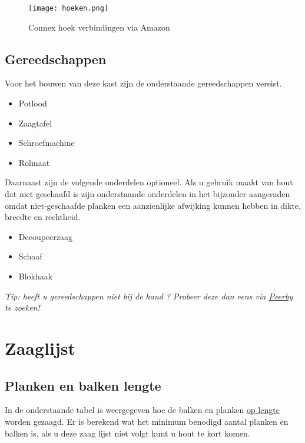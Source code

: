 \documentclass{article}
\begin{document}


\begin{figure}[h!]
    \centering
    \texttt{[image: hoeken.png]}
    \caption{Connex hoek verbindingen via Amazon}
    \label{fig:hoeken}
\end{figure}

\subsection{Gereedschappen}

Voor het bouwen van deze kast zijn de onderstaande gereedschappen vereist.

\begin{itemize}
    \item Potlood 
    \item Zaagtafel
    \item Schroefmachine
    \item Rolmaat
\end{itemize}

Daarnaast zijn de volgende onderdelen optioneel. Als u gebruik maakt van hout dat niet geschaafd is zijn onderstaande onderdelen in het bijzonder aangeraden omdat niet-geschaafde planken een aanzienlijke afwijking kunnen hebben in dikte, breedte en rechtheid.

\begin{itemize}
    \item Decoupeerzaag
    \item Schaaf
    \item Blokhaak
\end{itemize}

\begin{center}
    \textit{Tip: heeft u gereedschappen niet bij de hand ? Probeer deze dan eens via \href{https://www.peerby.com/en-nl}{Peerby} te zoeken!}
\end{center}

\clearpage
\newpage

\section{Zaaglijst}

\subsection{Planken en balken lengte}

In de onderstaande tabel is weergegeven hoe de balken en planken \underline{op lengte} worden gezaagd. Er is berekend wat het minimum benodigd aantal planken en balken is, als u deze zaag lijst niet volgt kunt u hout te kort komen.
\end{document}
